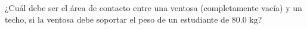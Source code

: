 \item ¿Cuál debe ser el área de contacto entre una ventosa (completamente vacía) y un techo, si la ventosa debe soportar el peso de un estudiante de $80.0 \text{ kg}$?

